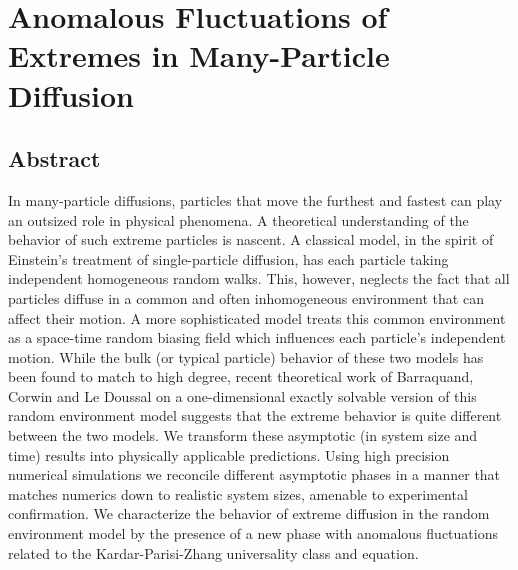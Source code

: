 
\newcommand{\mean}[1]{\mathrm{Mean}\left(#1\right)}


\newcommand{\meanasy}[1]{\mathrm{Mean}^{\textrm{\tiny{asy}}}\!\left(#1\right)}
\newcommand{\varasy}[1]{\mathrm{Var}^{\textrm{\tiny{asy}}}\!\left(#1\right)}

\newcommand{\meannum}[1]{\mathrm{Mean}^{\textrm{\tiny{num}}}\!\left(#1\right)}
\newcommand{\varnum}[1]{\mathrm{Var}^{\textrm{\tiny{num}}}\!\left(#1\right)}



\def\maxnt{\mathrm{Max}^{N}_t}
\def\envnt{\mathrm{Env}^{N}_t}
\def\snt{\mathrm{Sam}^{N}_t}

\makeatletter
\newcommand{\hathat}[1]{%
\begingroup%
  \let\macc@kerna\z@%
  \let\macc@kernb\z@%
  \let\macc@nucleus\@empty%
  \hat{\raisebox{.2ex}{\vphantom{\ensuremath{#1}}}\smash{\hat{#1}}}%
\endgroup%
}
\makeatother

\chapter{Anomalous Fluctuations of Extremes in Many-Particle Diffusion}
\label{1Drandom}

\section{Abstract}
In many-particle diffusions, particles that move the furthest and fastest can play an outsized role in physical phenomena. A theoretical understanding of the behavior of such extreme particles is nascent. A classical model, in the spirit of Einstein's  treatment of single-particle diffusion, has each particle taking independent homogeneous random walks. This, however, neglects the fact that all particles diffuse in a common and often inhomogeneous environment that can affect their motion. A more sophisticated model treats this common environment as a space-time random biasing field which influences each particle's independent motion. While the bulk (or typical particle) behavior of these two models has been found to match to high degree, recent theoretical work of Barraquand, Corwin and Le Doussal on a one-dimensional exactly solvable version of this random environment model suggests that the extreme behavior is quite different between the two models. We transform these asymptotic (in system size and time) results into physically applicable predictions. Using high precision numerical simulations we reconcile different asymptotic phases in a manner that matches numerics down to realistic system sizes, amenable to experimental confirmation. We characterize the behavior of extreme diffusion in the random environment model by the presence of a new phase with anomalous fluctuations related to the Kardar-Parisi-Zhang universality class and equation.

